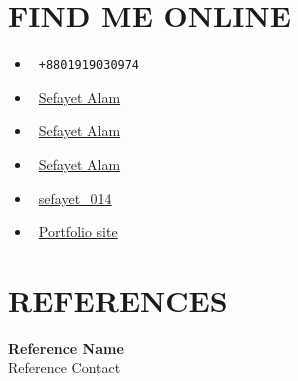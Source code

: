 \documentclass[a4paper,10pt]{article}
\begin{document}
\begin{multicols}{2}
\section*{FIND ME ONLINE}
\begin{itemize}[leftmargin=*]
    \item \faPhone \ \texttt{+8801919030974}
    \item \faGithub \ \href{https://github.com/Sefayet-Alam}{Sefayet Alam}
    \item \faFacebook \ \href{https://www.facebook.com/profile.php?id=100006222377716}{Sefayet Alam}
    \item \faLinkedin \ \href{https://www.linkedin.com/in/sefayet-alam-833ab424/}{Sefayet Alam}
    \item \faInstagram \ \href{https://instagram.com/sefayet_014/}{sefayet\_014}
    \item \faGlobe \ \href{https://sefayet.xyz}{Portfolio site}
\end{itemize}

\section*{REFERENCES}
\textbf{Reference Name} \\
Reference Contact

\end{multicols}
\end{document}

